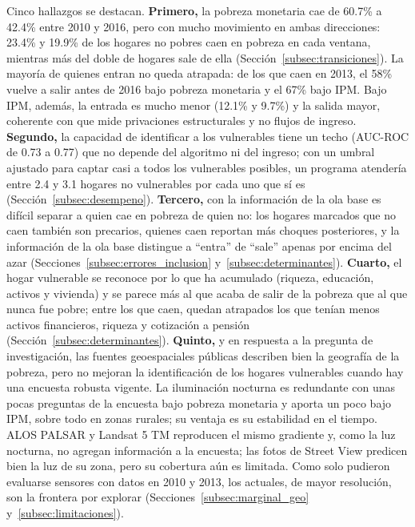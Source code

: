 \documentclass[12pt, letterpaper]{article}
\begin{document}
Cinco hallazgos se destacan. \textbf{Primero,} la pobreza monetaria cae de
60.7\% a 42.4\% entre 2010 y 2016, pero con mucho movimiento en ambas
direcciones: 23.4\% y 19.9\% de los hogares no pobres caen en pobreza en
cada ventana, mientras más del doble de hogares sale de ella
(Sección~\ref{subsec:transiciones}). La mayoría de quienes entran no queda atrapada:
de los que caen en 2013, el 58\% vuelve a salir antes de 2016 bajo pobreza
monetaria y el 67\% bajo IPM. Bajo IPM, además, la entrada es mucho menor
(12.1\% y 9.7\%) y la salida mayor, coherente con que mide privaciones
estructurales y no flujos de ingreso. \textbf{Segundo,} la capacidad de
identificar a los vulnerables tiene un techo (AUC-ROC de 0.73 a 0.77) que
no depende del algoritmo ni del ingreso; con un umbral ajustado para captar casi a
todos los vulnerables posibles, un programa atendería entre 2.4 y 3.1 hogares no vulnerables por cada
uno que sí es (Sección~\ref{subsec:desempeno}). \textbf{Tercero,} con la
información de la ola base es difícil separar a quien cae en pobreza de quien no: los
hogares marcados que no caen también son precarios, quienes caen reportan
más choques posteriores, y la información de la ola base distingue a ``entra'' de
``sale'' apenas por encima del azar (Secciones~\ref{subsec:errores_inclusion}
y~\ref{subsec:determinantes}).
\textbf{Cuarto,} el hogar vulnerable se reconoce por lo que ha acumulado
(riqueza, educación, activos y vivienda) y se parece más al que acaba de
salir de la pobreza que al que nunca fue pobre; entre los que caen,
quedan atrapados los que tenían menos activos financieros, riqueza y
cotización a pensión (Sección~\ref{subsec:determinantes}). \textbf{Quinto,} y
en respuesta a la pregunta de investigación, las fuentes geoespaciales
públicas describen bien la geografía de la pobreza, pero no mejoran la
identificación de los hogares vulnerables cuando hay una encuesta robusta
vigente. La iluminación nocturna es redundante con unas pocas preguntas
de la encuesta bajo pobreza monetaria y aporta un poco bajo IPM, sobre todo
en zonas rurales; su ventaja es su estabilidad en el tiempo. ALOS PALSAR
y Landsat 5 TM reproducen el mismo gradiente y, como la luz nocturna, no
agregan información a la encuesta; las fotos de Street View predicen bien
la luz de su zona, pero su cobertura aún es limitada. Como solo pudieron
evaluarse sensores con datos en 2010 y 2013, los actuales, de mayor
resolución, son la frontera por explorar
(Secciones~\ref{subsec:marginal_geo} y~\ref{subsec:limitaciones}).
\end{document}
